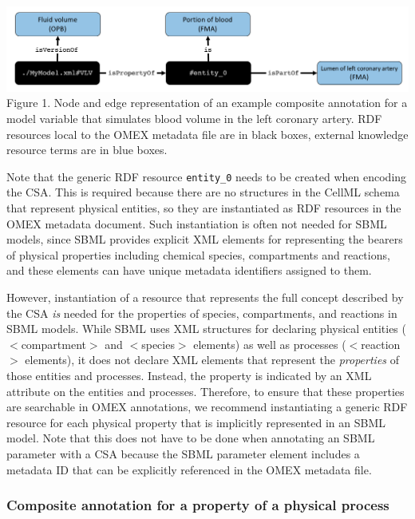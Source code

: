 \documentclass[pdftex,rgb,dvipsnames,svgnames,hyperref,table]{report}
\begin{document}
\includegraphics[width=\textwidth]{CSAexample.png}
   \footnotesize Figure 1. Node and edge representation of an example composite annotation for a model variable that simulates blood volume in the left coronary artery. RDF resources local to the OMEX metadata file are in black boxes, external knowledge resource terms are in blue boxes.
\vspace{5mm}

\normalsize
Note that the generic RDF resource \texttt{entity\_0} needs to be created when encoding the CSA. This is required because there are no structures in the CellML schema that represent physical entities, so they are instantiated as RDF resources in the OMEX metadata document. Such instantiation is often not needed for SBML models, since SBML provides explicit XML elements for representing the bearers of physical properties including chemical species, compartments and reactions, and these elements can have unique metadata identifiers assigned to them. 

However, instantiation of a resource that represents the full concept described by the CSA \textit{is} needed for the properties of species, compartments, and reactions in SBML models. While SBML uses XML structures for declaring physical entities ($<$compartment$>$ and $<$species$>$ elements) as well as processes ($<$reaction$>$ elements), it does not declare XML elements that represent the \textit{properties} of those entities and processes. Instead, the property is indicated by an XML attribute on the entities and processes. Therefore, to ensure that these properties are searchable in OMEX annotations, we recommend instantiating a generic RDF resource for each physical property that is implicitly represented in an SBML model. Note that this does not have to be done when annotating an SBML parameter with a CSA because the SBML parameter element includes a metadata ID that can be explicitly referenced in the OMEX metadata file.

\subsubsection{Composite annotation for a property of a physical process}
\end{document}
